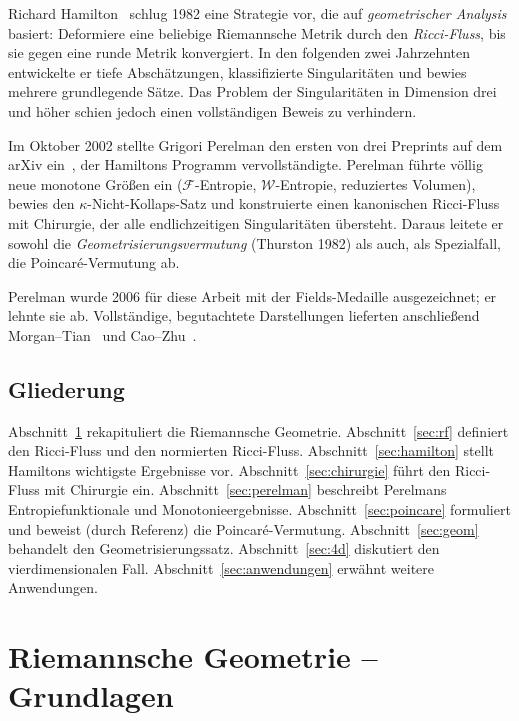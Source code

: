 \documentclass[12pt,a4paper]{amsart}
\theoremstyle{definition}
\theoremstyle{remark}
\begin{document}
Richard Hamilton~\cite{Hamilton1982} schlug 1982 eine Strategie vor, die auf
\emph{geometrischer Analysis} basiert: Deformiere eine beliebige Riemannsche
Metrik durch den \emph{Ricci-Fluss}, bis sie gegen eine runde Metrik
konvergiert.  In den folgenden zwei Jahrzehnten entwickelte er tiefe
Abschätzungen, klassifizierte Singularitäten und bewies mehrere grundlegende
Sätze.  Das Problem der Singularitäten in Dimension drei und höher schien
jedoch einen vollständigen Beweis zu verhindern.

Im Oktober 2002 stellte Grigori Perelman den ersten von drei Preprints auf
dem arXiv ein~\cite{Perelman2002,Perelman2003a,Perelman2003b}, der Hamiltons
Programm vervollständigte.  Perelman führte völlig neue monotone Größen ein
($\mathcal{F}$-Entropie, $\mathcal{W}$-Entropie, reduziertes Volumen),
bewies den $\kappa$-Nicht-Kollaps-Satz und konstruierte einen kanonischen
Ricci-Fluss mit Chirurgie, der alle endlichzeitigen Singularitäten übersteht.
Daraus leitete er sowohl die \emph{Geometrisierungsvermutung} (Thurston 1982)
als auch, als Spezialfall, die Poincaré-Vermutung ab.

Perelman wurde 2006 für diese Arbeit mit der Fields-Medaille ausgezeichnet;
er lehnte sie ab.  Vollständige, begutachtete Darstellungen lieferten
anschließend Morgan--Tian~\cite{MorganTian2007} und Cao--Zhu~\cite{CaoZhu2006}.

\subsection*{Gliederung}
Abschnitt~\ref{sec:riem} rekapituliert die Riemannsche Geometrie.
Abschnitt~\ref{sec:rf} definiert den Ricci-Fluss und den normierten Ricci-Fluss.
Abschnitt~\ref{sec:hamilton} stellt Hamiltons wichtigste Ergebnisse vor.
Abschnitt~\ref{sec:chirurgie} führt den Ricci-Fluss mit Chirurgie ein.
Abschnitt~\ref{sec:perelman} beschreibt Perelmans Entropiefunktionale
und Monotonieergebnisse.
Abschnitt~\ref{sec:poincare} formuliert und beweist (durch Referenz)
die Poincaré-Vermutung.
Abschnitt~\ref{sec:geom} behandelt den Geometrisierungssatz.
Abschnitt~\ref{sec:4d} diskutiert den vierdimensionalen Fall.
Abschnitt~\ref{sec:anwendungen} erwähnt weitere Anwendungen.


\section{Riemannsche Geometrie -- Grundlagen}
\label{sec:riem}
\end{document}
